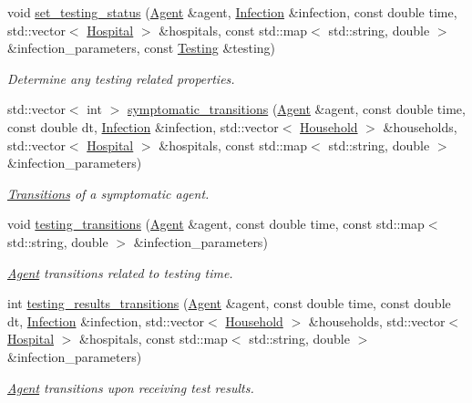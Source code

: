 \begin{DoxyCompactItemize}
void \hyperlink{classHspPatientTransitions_a0b1b734e3e075b4fa90c5adc24809b5c}{set\+\_\+testing\+\_\+status} (\hyperlink{classAgent}{Agent} \&agent, \hyperlink{classInfection}{Infection} \&infection, const double time, std\+::vector$<$ \hyperlink{classHospital}{Hospital} $>$ \&hospitals, const std\+::map$<$ std\+::string, double $>$ \&infection\+\_\+parameters, const \hyperlink{classTesting}{Testing} \&testing)
\begin{DoxyCompactList}\small\item\em Determine any testing related properties. \end{DoxyCompactList}\item 
std\+::vector$<$ int $>$ \hyperlink{classHspPatientTransitions_aaeb2177a0e70028f01c092c0bf48863c}{symptomatic\+\_\+transitions} (\hyperlink{classAgent}{Agent} \&agent, const double time, const double dt, \hyperlink{classInfection}{Infection} \&infection, std\+::vector$<$ \hyperlink{classHousehold}{Household} $>$ \&households, std\+::vector$<$ \hyperlink{classHospital}{Hospital} $>$ \&hospitals, const std\+::map$<$ std\+::string, double $>$ \&infection\+\_\+parameters)
\begin{DoxyCompactList}\small\item\em \hyperlink{classTransitions}{Transitions} of a symptomatic agent. \end{DoxyCompactList}\item 
void \hyperlink{classHspPatientTransitions_a6cf6a821e7ec9aa77a5cb74ff9104d0b}{testing\+\_\+transitions} (\hyperlink{classAgent}{Agent} \&agent, const double time, const std\+::map$<$ std\+::string, double $>$ \&infection\+\_\+parameters)
\begin{DoxyCompactList}\small\item\em \hyperlink{classAgent}{Agent} transitions related to testing time. \end{DoxyCompactList}\item 
int \hyperlink{classHspPatientTransitions_a90b603dcad14fa9a76acaa098a210fae}{testing\+\_\+results\+\_\+transitions} (\hyperlink{classAgent}{Agent} \&agent, const double time, const double dt, \hyperlink{classInfection}{Infection} \&infection, std\+::vector$<$ \hyperlink{classHousehold}{Household} $>$ \&households, std\+::vector$<$ \hyperlink{classHospital}{Hospital} $>$ \&hospitals, const std\+::map$<$ std\+::string, double $>$ \&infection\+\_\+parameters)
\begin{DoxyCompactList}\small\item\em \hyperlink{classAgent}{Agent} transitions upon receiving test results. \end{DoxyCompactList}\item 

\end{DoxyCompactItemize}

